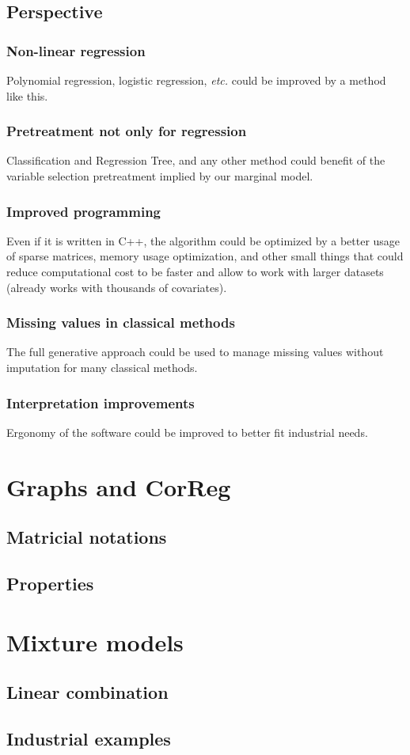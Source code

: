 \documentclass[11pt,a4paper]{report}
\begin{document}
		
	\section{Perspective}
		\subsection{Non-linear regression}
			Polynomial regression, logistic regression, {\it etc.} could be improved by a method like this.
		\subsection{Pretreatment not only for regression}
			Classification and Regression Tree, and any other method could benefit of the variable selection pretreatment implied by our marginal model.
		\subsection{Improved programming}
			Even if it is written in C++, the algorithm could be optimized by a better usage of sparse matrices, memory usage optimization, and other small things that could reduce computational cost to be faster and allow to work with larger datasets (already works with thousands of covariates).
		\subsection{Missing values in classical methods}
			The full generative approach could be used to manage missing values without imputation for many classical methods.
		\subsection{Interpretation improvements}
			Ergonomy of the software could be improved to better fit industrial needs.
\cleardoublepage



\appendix
	\chapter{Graphs and CorReg}
		\section{Matricial notations}
		\section{Properties}
	\chapter{Mixture models}
		\section{Linear combination}
			
		\section{Industrial examples}	
\end{document}
